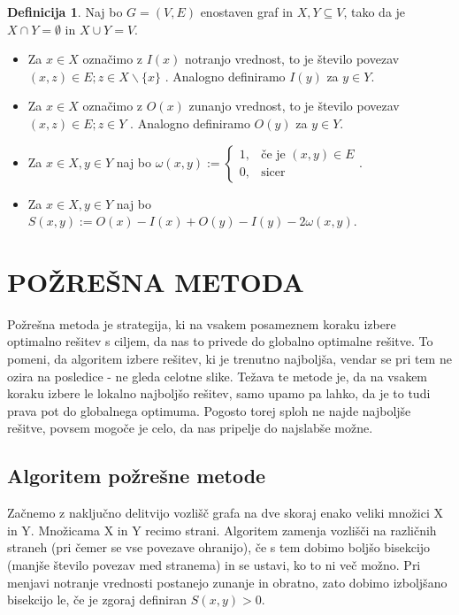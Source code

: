 \documentclass[12pt,a4paper]{amsart}
\theoremstyle{definition} %
\newtheorem{definicija}{Definicija}[section]
\theoremstyle{plain} %
\begin{document}
\begin{definicija}
Naj bo $G=(V,E)$ enostaven graf in $X,Y \subseteq V$, tako da je $X \cap Y = \emptyset$ in $X \cup Y =V$.
\begin{itemize}
\item Za $x \in X$ označimo z $I(x)$ notranjo vrednost, to je število povezav $(x,z) \in E;z\in X \backslash \{x\}$ . Analogno definiramo $I(y)$ za $y \in Y$.
\item Za $x \in X$ označimo z $O(x)$ zunanjo vrednost, to je število povezav $(x,z) \in E;z\in Y $ . Analogno definiramo $O(y)$ za $y \in Y$.
\item Za $x \in X, y \in Y$ naj bo $\omega(x,y) := \begin{cases} 1,&\text{če je \ } (x,y) \in E\\ 
0, &\text{sicer}\end{cases} $.
\item Za $x \in X, y \in Y$ naj bo $S(x,y):= O(x)-I(x)+O(y)-I(y)-2\omega(x,y)$.
\end{itemize}
\end{definicija}
\bigbreak

\section{\textbf{POŽREŠNA METODA}}
Požrešna metoda je strategija, ki na vsakem posameznem koraku izbere optimalno rešitev s ciljem, da nas to privede do globalno optimalne rešitve. To pomeni, da algoritem izbere rešitev, ki je trenutno najboljša, vendar se pri tem ne ozira na posledice - ne gleda celotne slike. Težava te metode je, da na vsakem koraku izbere le lokalno najboljšo rešitev, samo upamo pa lahko, da je to tudi prava pot do globalnega optimuma. Pogosto torej sploh ne najde najboljše rešitve, povsem mogoče je celo, da nas pripelje do najslabše možne. \\

\subsection{Algoritem požrešne metode}
Začnemo z naključno delitvijo vozlišč grafa na dve skoraj enako veliki množici X in Y. Množicama X in Y recimo strani. Algoritem zamenja vozlišči na različnih straneh (pri čemer se vse povezave ohranijo), če s tem dobimo boljšo bisekcijo (manjše število povezav med stranema) in se ustavi, ko to ni več možno. Pri menjavi notranje vrednosti postanejo zunanje in obratno, zato dobimo izboljšano bisekcijo le, če je zgoraj definiran $S(x,y)>0$. \\
\end{document}
